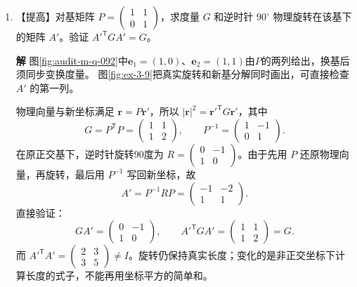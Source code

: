 \documentclass[11pt,openany,fontset=fandol]{ctexbook}
\theoremstyle{plain}\newtheorem{theorem}{定理}[chapter]\newtheorem{proposition}[theorem]{命题}
\theoremstyle{definition}\newtheorem{definition}{定义}[chapter]\newtheorem{example}{例}[chapter]
\theoremstyle{remark}\newtheorem*{remark}{说明}
\newcommand{\SolutionStart}{\par\nobreak\medskip\nobreak\noindent\textbf{解}\quad\ignorespaces}
\newenvironment{solution}{\SolutionStart}{\par\medskip}
\newcommand{\vct}[1]{\bm{#1}}\newcommand{\Rea}{\operatorname{Re}}\newcommand{\Ima}{\operatorname{Im}}
\begin{document}
\begin{enumerate}[label=3.\arabic*]
\begin{solution}
图中 $OC=\ell/2$ 沿杆，不垂直转轴；只有它在转轴法向的投影 $d$ 才能进入平行轴项。
\end{solution}

\item \begin{minipage}[t]{\linewidth}
【提高】对基矩阵 $P=\begin{pmatrix}1&1\\0&1\end{pmatrix}$，求度量 $G$ 和逆时针 $90^\circ$ 物理旋转在该基下的矩阵 $A'$。验证 $A'^{\mathsf T}GA'=G$。

\end{minipage}

\begin{solution}
图\ref{fig:audit-m-q-092}中$\vct e_1=(1,0)$、$\vct e_2=(1,1)$由$P$的两列给出，换基后须同步变换度量。
图\ref{fig:ex-3-9}把真实旋转和新基分解同时画出，可直接检查 $A'$ 的第一列。

物理向量与新坐标满足 $\vct r=P\vct r'$，所以 $|\vct r|^2=\vct r'^{\mathsf T}G\vct r'$，其中
\[
G=P^{\mathsf T}P=\begin{pmatrix}1&1\\1&2\end{pmatrix},\qquad
P^{-1}=\begin{pmatrix}1&-1\\0&1\end{pmatrix}.
\]
在原正交基下，逆时针旋转90度为 $R=\begin{pmatrix}0&-1\\1&0\end{pmatrix}$。由于先用 $P$ 还原物理向量，再旋转，最后用 $P^{-1}$ 写回新坐标，故
\[
A'=P^{-1}RP=\begin{pmatrix}-1&-2\\1&1\end{pmatrix}.
\]
直接验证：
\[
GA'=\begin{pmatrix}0&-1\\1&0\end{pmatrix},\qquad
A'^{\mathsf T}GA'=\begin{pmatrix}1&1\\1&2\end{pmatrix}=G.
\]
而 $A'^{\mathsf T}A'=\begin{pmatrix}2&3\\3&5\end{pmatrix}\ne I$。旋转仍保持真实长度；变化的是非正交坐标下计算长度的式子，不能再用坐标平方的简单和。


\end{solution}
\end{enumerate}
\end{document}
